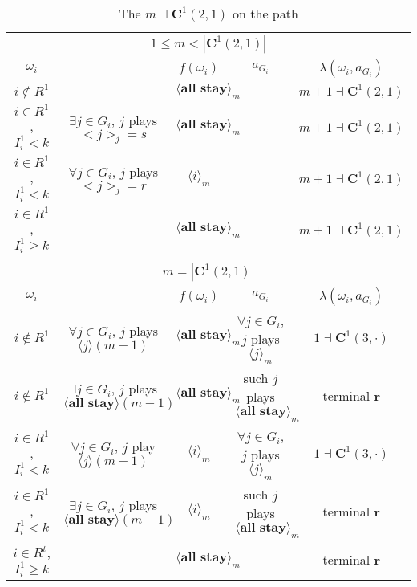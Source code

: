 \documentclass[12pt,letter]{article}
\newcommand{\Kappa}{\mathbf{C}}
\theoremstyle{definition}
\theoremstyle{remark}
\theoremstyle{claim}
\begin{document}
\begin{landscape}
\begin{table}[!htbp]
\caption{The $m\dashv\Kappa^1(2,1)$ on the path}
\label{table:eqm_path_k02}
\begin{center}
\begin{tabular}{c c | c | c | c}
\multicolumn{5}{c}{$1\leq m < |\Kappa^1(2,1)|$}\\
$\omega_i$ 	 & 	   &	$f(\omega_i)$  &	$a_{G_i}$ & $\lambda(\omega_i,a_{G_i})$ \\
\hline
\hline
$i\notin R^1$  	& & $\langle \textbf{all stay} \rangle_m$	&    & $m+1\dashv \Kappa^1(2,1)$\\
$i\in R^1$, $I^1_i< k$  	& $\exists j\in G_i$, $j$ plays $<j>_j=s$	& $\langle \textbf{all stay} \rangle_m$	& 	& $m+1\dashv \Kappa^1(2,1)$\\
$i\in R^1$, $I^1_i< k$  	& $\forall j\in G_i$, $j$ plays $<j>_j=r$ 	& $\langle i \rangle_m$	& 	& $m+1\dashv \Kappa^1(2,1)$\\
$i\in R^1$, $I^1_i\geq k$  	& 	& $\langle \textbf{all stay} \rangle_m$	&	& $m+1\dashv \Kappa^1(2,1)$\\
\hline
\\
\multicolumn{5}{c}{$m= |\Kappa^1(2,1)|$}\\
$\omega_i$ 	 & 	   &	$f(\omega_i)$  &	$a_{G_i}$ & $\lambda(\omega_i,a_{G_i})$ \\
\hline
\hline
$i\notin R^1$  	& $\forall j\in G_i$, $j$ plays $\langle j \rangle(m-1)$    & $\langle \textbf{all stay} \rangle_m$	& $\forall j\in G_i$, $j$ plays $\langle j \rangle_m$	& $1\dashv \Kappa^1(3,\cdot)$\\
$i\notin R^1$  	& $\exists j\in G_i$, $j$ plays $\langle \textbf{all stay} \rangle(m-1)$   & $\langle \textbf{all stay} \rangle_m$	& such $j$ plays $\langle \textbf{all stay} \rangle_m$	& terminal \textbf{r}\\
$i\in R^1$, $I^1_i< k$   	& $\forall j\in G_i$, $j$ play $\langle j \rangle(m-1)$ 	& $\langle i \rangle_m$	&  $\forall j\in G_i$, $j$ plays $\langle j \rangle_m$	& $1\dashv \Kappa^1(3,\cdot)$ \\
$i\in R^1$, $I^1_i< k$   	&  $\exists j\in G_i$, $j$ plays $\langle \textbf{all stay} \rangle(m-1)$ 	& $\langle i \rangle_m$	& such $j$ plays $\langle \textbf{all stay} \rangle_m$	&  terminal \textbf{r}\\
$i\in R^t$, $I^1_i\geq k$  	& 	& $\langle \textbf{all stay} \rangle_m$	& 	& terminal \textbf{r} \\
\hline
\end{tabular}
\end{center}
\end{table}

\end{landscape}
\end{document}
